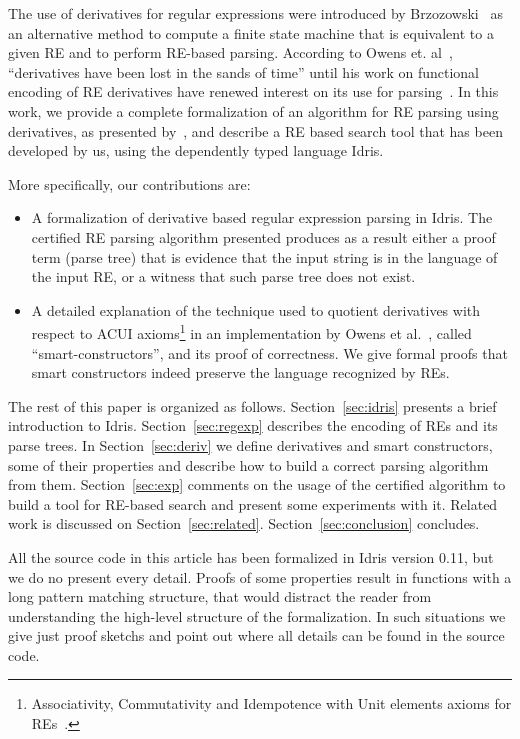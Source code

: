 \documentclass{llncs}
\begin{document}
The use of derivatives for regular expressions were introduced by
Brzozowski~\cite{Brzozowski1964} as an alternative method to compute a
finite state machine that is equivalent to a given RE and to perform
RE-based parsing. According to Owens et. al~\cite{Owens2009},
``derivatives have been lost in the sands of time'' until his work on
functional encoding of RE derivatives have renewed interest on its use
for parsing~\cite{Might2011,Fischer2010}.  In this work, we provide a
complete formalization of an algorithm for RE parsing using
derivatives, as presented by~\cite{Owens2009}, and describe a RE based
search tool that has been developed by us, using the dependently typed
language Idris.

More specifically, our contributions are:
\begin{itemize}
  \item A formalization of derivative based regular expression parsing
    in Idris. The certified RE parsing algorithm presented produces as
    a result either a proof term (parse tree) that is evidence that
    the input string is in the language of the input RE, or a witness
    that such parse tree does not exist.

  \item A detailed explanation of the technique used to quotient
    derivatives with respect to ACUI axioms\footnote{Associativity,
      Commutativity and Idempotence with Unit elements axioms for
      REs~\cite{Brzozowski1964}.} in an implementation by Owens et
    al.~\cite{Owens2009}, called ``smart-constructors'', and its proof
    of correctness. We give formal proofs that smart constructors
    indeed preserve the language recognized by REs.
\end{itemize}

The rest of this paper is organized as
follows. Section~\ref{sec:idris} presents a brief introduction to
Idris. Section~\ref{sec:regexp} describes the encoding of REs and its
parse trees. In Section~\ref{sec:deriv} we define derivatives and
smart constructors, some of their properties and describe how to build
a correct parsing algorithm from them. Section~\ref{sec:exp} comments
on the usage of the certified algorithm to build a tool for RE-based
search and present some experiments with it. Related work is discussed
on Section~\ref{sec:related}.  Section~\ref{sec:conclusion} concludes.

All the source code in this article has been formalized in Idris
version 0.11, but
we do no present every detail. Proofs of some properties result in
functions with a long pattern matching structure, that would distract
the reader from understanding the high-level structure of the
formalization. In such situations we give just proof sketchs and point
out where all details can be found in the source code.
\end{document}
